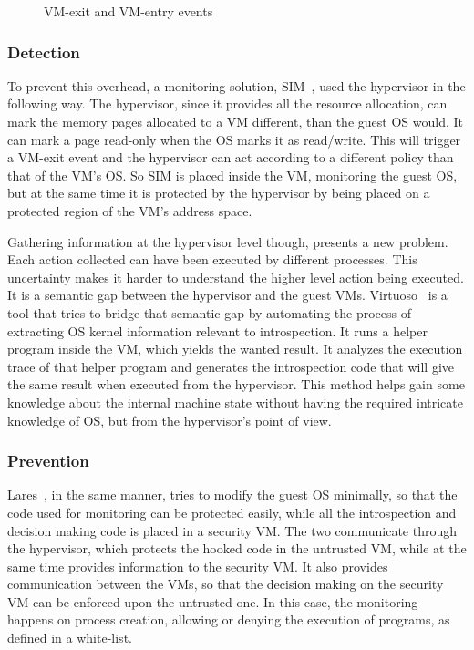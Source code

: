 \begin{figure}[ht]
	\centering
	
	\caption{VM-exit and VM-entry events}
	\label{fig:vmevents}
\end{figure}

\subsubsection{Detection}

To prevent this overhead, a monitoring solution, SIM~\cite{sharif2009secure}, used the hypervisor in the following way. The hypervisor, since it provides all the resource allocation, can mark the memory pages allocated to a \ac{VM} different, than the guest \ac{OS} would. It can mark a page read-only when the \ac{OS} marks it as read/write. This will trigger a \ac{VM}-exit event and the hypervisor can act according to a different policy than that of the \ac{VM}’s \ac{OS}. So SIM is placed inside the \ac{VM}, monitoring the guest \ac{OS}, but at the same time it is protected by the hypervisor by being placed on a protected region of the \ac{VM}’s address space. 

\par Gathering information at the hypervisor level though, presents a new problem. Each action collected can have been executed by different processes. This uncertainty makes it harder to understand the higher level action being executed. It is a semantic gap between the hypervisor and the guest \ac{VM}s. Virtuoso~\cite{dolan2011virtuoso} is a tool that tries to bridge that semantic gap by automating the process of extracting \ac{OS} kernel information relevant to introspection. It runs a helper program inside the \ac{VM}, which yields the wanted result. It analyzes the execution trace of that helper program and generates the introspection code that will give the same result when executed from the hypervisor. This method helps gain some knowledge about the internal machine state without having the required intricate knowledge of \ac{OS}, but from the hypervisor’s point of view. 

\subsubsection{Prevention}

Lares~\cite{payne2008lares}, in the same manner, tries to modify the guest \ac{OS} minimally, so that the code used for monitoring can be protected easily, while all the introspection and decision making code is placed in a security \ac{VM}. The two communicate through the hypervisor, which protects the hooked code in the untrusted \ac{VM}, while at the same time provides information to the security \ac{VM}. It also provides communication between the \ac{VM}s, so that the decision making on the security \ac{VM} can be enforced upon the untrusted one. In this case, the monitoring happens on process creation, allowing or denying the execution of programs, as defined in a white-list.

